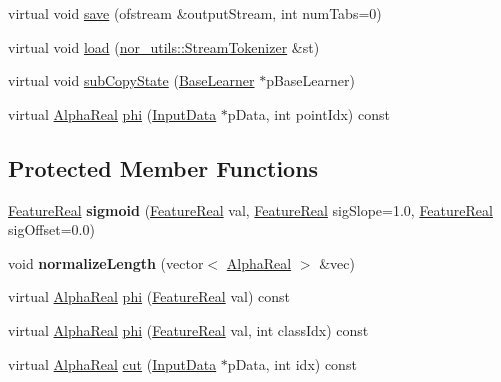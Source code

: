 \begin{DoxyCompactItemize}
\item 
virtual void \hyperlink{classMultiBoost_1_1SigmoidSingleStumpLearner_a974bf887a0c8ddf5be49259d702c9b05}{save} (ofstream \&outputStream, int numTabs=0)
\item 
virtual void \hyperlink{classMultiBoost_1_1SigmoidSingleStumpLearner_a26f1c20fee776dc11fac049d40e74689}{load} (\hyperlink{classnor__utils_1_1StreamTokenizer}{nor\_\-utils::StreamTokenizer} \&st)
\item 
virtual void \hyperlink{classMultiBoost_1_1SigmoidSingleStumpLearner_adb4ca5ac6be19aa7244d04ac7b24d79d}{subCopyState} (\hyperlink{classMultiBoost_1_1BaseLearner}{BaseLearner} $\ast$pBaseLearner)
\item 
virtual \hyperlink{Defaults_8h_a80184c4fd10ab70a1a17c5f97dcd1563}{AlphaReal} \hyperlink{classMultiBoost_1_1SigmoidSingleStumpLearner_af2a3f587297f4673c44b9a132596c49b}{phi} (\hyperlink{classMultiBoost_1_1InputData}{InputData} $\ast$pData, int pointIdx) const 
\end{DoxyCompactItemize}
\subsection*{Protected Member Functions}
\begin{DoxyCompactItemize}
\item 
\hypertarget{classMultiBoost_1_1SigmoidSingleStumpLearner_afb3ca76f32c641c6b225af93d41f312e}{
\hyperlink{Defaults_8h_a3a11cfe6a5d469d921716ca6291e934f}{FeatureReal} {\bfseries sigmoid} (\hyperlink{Defaults_8h_a3a11cfe6a5d469d921716ca6291e934f}{FeatureReal} val, \hyperlink{Defaults_8h_a3a11cfe6a5d469d921716ca6291e934f}{FeatureReal} sigSlope=1.0, \hyperlink{Defaults_8h_a3a11cfe6a5d469d921716ca6291e934f}{FeatureReal} sigOffset=0.0)}
\label{classMultiBoost_1_1SigmoidSingleStumpLearner_afb3ca76f32c641c6b225af93d41f312e}

\item 
\hypertarget{classMultiBoost_1_1SigmoidSingleStumpLearner_a4f0c63c8a8136bec76de69d85cc016fd}{
void {\bfseries normalizeLength} (vector$<$ \hyperlink{Defaults_8h_a80184c4fd10ab70a1a17c5f97dcd1563}{AlphaReal} $>$ \&vec)}
\label{classMultiBoost_1_1SigmoidSingleStumpLearner_a4f0c63c8a8136bec76de69d85cc016fd}

\item 
virtual \hyperlink{Defaults_8h_a80184c4fd10ab70a1a17c5f97dcd1563}{AlphaReal} \hyperlink{classMultiBoost_1_1SigmoidSingleStumpLearner_a13b5c4d35be1fae796113b2b84a3f542}{phi} (\hyperlink{Defaults_8h_a3a11cfe6a5d469d921716ca6291e934f}{FeatureReal} val) const 
\item 
virtual \hyperlink{Defaults_8h_a80184c4fd10ab70a1a17c5f97dcd1563}{AlphaReal} \hyperlink{classMultiBoost_1_1SigmoidSingleStumpLearner_aeb660f36dc730d8181253b6d0b28064a}{phi} (\hyperlink{Defaults_8h_a3a11cfe6a5d469d921716ca6291e934f}{FeatureReal} val, int classIdx) const 
\item 
virtual \hyperlink{Defaults_8h_a80184c4fd10ab70a1a17c5f97dcd1563}{AlphaReal} \hyperlink{classMultiBoost_1_1SigmoidSingleStumpLearner_acfef6de317582acc995f6b9c00f4a74d}{cut} (\hyperlink{classMultiBoost_1_1InputData}{InputData} $\ast$pData, int idx) const 
\end{DoxyCompactItemize}
